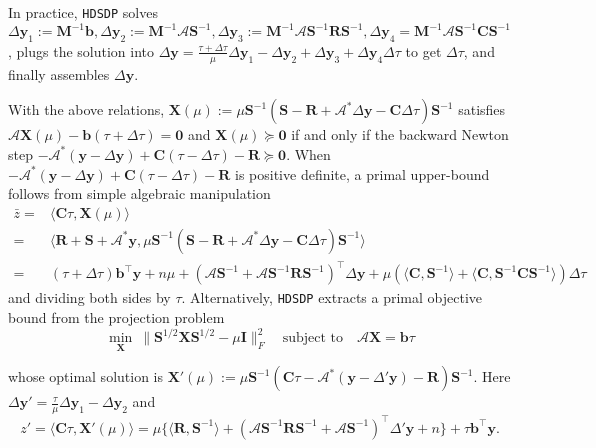 In practice, {{\texttt{HDSDP}}} solves $\Delta \mathbf{y}_1 := \mathbf{M}^{- 1} \mathbf{b},
\Delta \mathbf{y}_2 := \mathbf{M}^{- 1} \mathcal{A} \mathbf{S}^{- 1}, \Delta \mathbf{y}_3 := \mathbf{M}^{- 1} \mathcal{A}
\mathbf{S}^{- 1} \mathbf{R} \mathbf{S}^{- 1}, \Delta \mathbf{y}_4 = \mathbf{M}^{- 1} \mathcal{A} \mathbf{S}^{- 1} \mathbf{C} \mathbf{S}^{-
1}$, plugs the solution into $\Delta \mathbf{y} = \frac{\tau + \Delta \tau}{\mu} \Delta \mathbf{y}_1 - \Delta
\mathbf{y}_2 + \Delta \mathbf{y}_3 + \Delta \mathbf{y}_4 \Delta \tau$ to get $\Delta \tau$, and finally assembles $\Delta \mathbf{y}$.

 With the above relations, $\mathbf{X} (\mu) := \mu \mathbf{S}^{- 1}
( \mathbf{S} - \mathbf{R} +\mathcal{A}^{\ast} \Delta \mathbf{y} - \mathbf{C} \Delta \tau ) \mathbf{S}^{-
1}$ satisfies $\mathcal{A} \mathbf{X} (\mu) - \mathbf{b} (\tau + \Delta \tau) = \textbf{0}$ and $\mathbf{X} (\mu)
\succeq \textbf{0}$ if and only if the backward Newton step $-\mathcal{A}^{\ast} ( \mathbf{y} - \Delta \mathbf{y} ) + \mathbf{C} (\tau
- \Delta \tau) - \mathbf{R} \succeq \textbf{0}$. When $-\mathcal{A}^{\ast} ( \mathbf{y} -
\Delta \mathbf{y} ) + \mathbf{C} (\tau - \Delta \tau) - \mathbf{R}$ is positive definite, a primal upper-bound follows from simple algebraic manipulation
\begin{align*}
\bar{z}  ={} & \langle \mathbf{C} \tau, \mathbf{X} (\mu) \rangle\\
	  ={} & \langle \mathbf{R} + \mathbf{S} + \mathcal{A}^{\ast} \mathbf{y}, \mu \mathbf{S}^{- 1} ( \mathbf{S} - \mathbf{R}
  +\mathcal{A}^{\ast} \Delta \mathbf{y} - \mathbf{C} \Delta \tau ) \mathbf{S}^{- 1}
  \rangle\\
  ={} & (\tau + \Delta \tau) \mathbf{b}^{\top} \mathbf{y} + n \mu + ( \mathcal{A} \mathbf{S}^{- 1} +
  \mathcal{A} \mathbf{S}^{- 1} \mathbf{R} \mathbf{S}^{- 1} )^{\top} \Delta \mathbf{y} + \mu (
  \langle \mathbf{C}, \mathbf{S}^{- 1} \rangle + \langle \mathbf{C}, \mathbf{S}^{- 1} \mathbf{C}
  \mathbf{S}^{- 1} \rangle ) \Delta \tau
\end{align*}
and dividing both sides by $\tau$. Alternatively, {{\texttt{HDSDP}}} extracts a primal
objective bound from the projection problem
\[   \min_{\mathbf{X}} ~ \| \mathbf{S}^{1 / 2} \mathbf{X} \mathbf{S}^{1 / 2} - \mu \mathbf{I} \|_F^2 \quad \text{subject to} \quad \mathcal{A} \mathbf{X} = \mathbf{b} \tau \]

whose optimal solution is $\mathbf{X}' (\mu) := \mu \mathbf{S}^{- 1} ( \mathbf{C} \tau -
\mathcal{A}^{\ast} ( \mathbf{y} - \Delta' \mathbf{y} ) - \mathbf{R} ) \mathbf{S}^{- 1}$. Here
$\Delta \mathbf{y}' = \frac{\tau}{\mu} \Delta \mathbf{y}_1 - \Delta \mathbf{y}_2$ and
\[ z' = \langle \mathbf{C} \tau, \mathbf{X}' (\mu) \rangle = \mu \{
   \langle \mathbf{R}, \mathbf{S}^{- 1} \rangle + ( \mathcal{A} \mathbf{S}^{- 1} \mathbf{R}
   \mathbf{S}^{- 1} + \mathcal{A} \mathbf{S}^{- 1})^{\top} \Delta' \mathbf{y} + n \} + \tau
   \mathbf{b}^{\top} \mathbf{y} . \]

